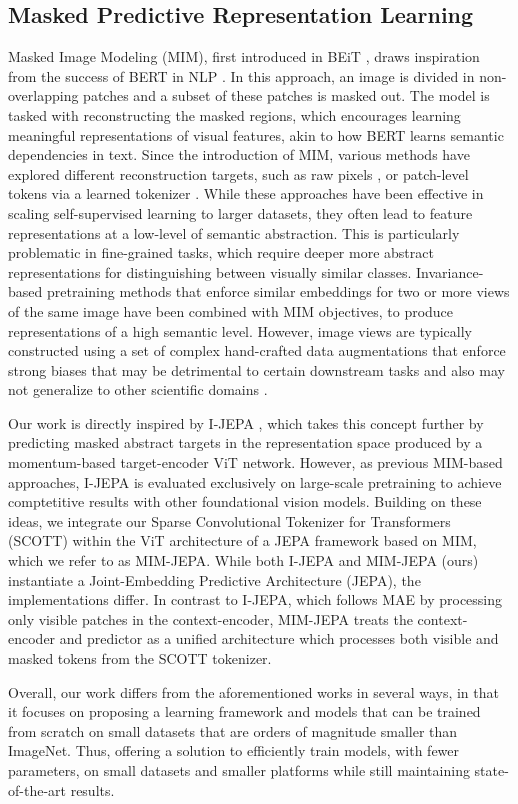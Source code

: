 \subsection{Masked Predictive Representation Learning}
Masked Image Modeling (MIM), first introduced in BEiT \citep{bao2021beit}, draws inspiration from the success of BERT in NLP \citep{Devlin_BERTPO}. In this approach, an image is divided in non-overlapping patches and a subset of these patches is masked out. The model is tasked with reconstructing the masked regions, which encourages learning meaningful representations of visual features, akin to how BERT learns semantic dependencies in text. Since the introduction of MIM, various methods have explored different reconstruction targets, such as raw  pixels \citep{he2022masked, xie2020unsupervised, xie_simmim_2022},  or patch-level tokens via a learned tokenizer \citep{bao2021beit, peng_beitv2_2022}. While these approaches have been effective in scaling self-supervised learning to larger datasets, they often lead to feature representations at a low-level of semantic abstraction. This is particularly problematic in fine-grained tasks, which require deeper more abstract representations for distinguishing between visually similar classes. Invariance-based pretraining methods that enforce similar embeddings for two or more views of the same image \citep{zhou2021ibot, oquab_dinov2_2024} have been combined with MIM objectives, to produce representations of a high semantic level. However, image views are typically constructed using a set of complex hand-crafted data augmentations that enforce strong biases that may be detrimental to certain downstream tasks \citep{assran2023self} and also may not generalize to other scientific domains \citep{huang_self-supervised_2023}. 

Our work is directly inspired by I-JEPA \citep{assran2023self}, which takes this concept further by predicting masked abstract targets in the representation space produced by a momentum-based target-encoder ViT network. However, as previous MIM-based approaches, I-JEPA is evaluated exclusively on large-scale pretraining to achieve comptetitive results with other foundational vision models. Building on these ideas, we integrate our Sparse Convolutional Tokenizer for Transformers (SCOTT) within the ViT architecture of a JEPA framework based on MIM, which we refer to as MIM-JEPA. While both I-JEPA and MIM-JEPA (ours) instantiate a Joint-Embedding Predictive Architecture (JEPA), the implementations differ. In contrast to I-JEPA, which follows MAE \citep{he2022masked} by processing only visible patches in the context-encoder, MIM-JEPA treats the context-encoder and predictor as a unified architecture which processes both visible and masked tokens from the SCOTT tokenizer. 

Overall, our work differs from the aforementioned works in several ways, in that it focuses on proposing a learning framework and models that can be trained from scratch on small datasets that are orders of magnitude smaller than ImageNet. Thus, offering a solution to efficiently train models, with fewer parameters, on small datasets and smaller platforms while still maintaining state-of-the-art results.
